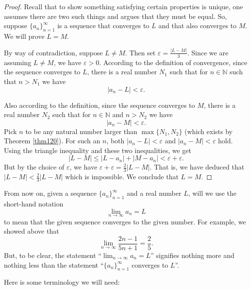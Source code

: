\documentclass[12pt]{amsart}
\def\e{\varepsilon}
\newcommand{\N}{\mathbb{N}}
\numberwithin{equation}{section}
\theoremstyle{plain} %
\theoremstyle{definition}
\theoremstyle{remark}
\begin{document}
\begin{proof} Recall that to show something satisfying certain properties is unique, one assumes there are two such things and argues that they must be equal. 
So,
suppose $\{a_n\}_{n=1}^\infty$ is a sequence that converges to $L$ and that also converges to $M$. We will prove $L = M$. 

By way of contradiction, suppose $L \ne M$. Then set $\e =
\frac{|L-M|}{3}$. Since we are assuming $L \ne M$, we have $\e > 0$.  
According to the definition of convergence, since the sequence converges to $L$, there is a real number $N_1$ such that for $n \in \N$ such that  $n > N_1$ we have
$$
|a_n - L| < \e.
$$

Also according to the definition, since the sequence converges to $M$, there is a real number $N_2$ such that for $n \in \N$ and  $n > N_2$ we have
$$
|a_n - M| < \e.
$$
Pick $n$ to be any natural number larger than $\max\{N_1, N_2\}$ (which exists by Theorem \ref{thm120}).   For such an $n$, both
$|a_n - L| < \e$ and $ |a_n - M| < \e$ hold. 
Using the triangle inequality and these two inequalities, we get
$$
|L-M| \leq |L-a_n| + |M-a_n| < \e + \e.
$$
But by the choice of $\e$, we have $\e + \e = \frac23 |L-M|$. That is, we have deduced that $|L-M| < \frac23 |L-M|$ which is impossible.
We conclude that $L = M$. 
\end{proof}




From now on, given a sequence $\{a_n\}_{n=1}^\infty$ and a real number $L$, 
will we use the short-hand notation
$$
\lim_{n \to \infty} a_n = L
$$
to mean that the given sequence converges to the given number. For example, we showed above that 
$$
\lim_{n \to \infty} \frac{2n - 1}{5n + 1}   = \frac25.
$$
But, to be clear, the statement ``$\lim_{n \to \infty} a_n = L$''
signifies nothing more and nothing less than the statement
``$\{a_n\}_{n=1}^\infty$ converges to $L$''.



Here is some terminology we will need:
\end{document}
